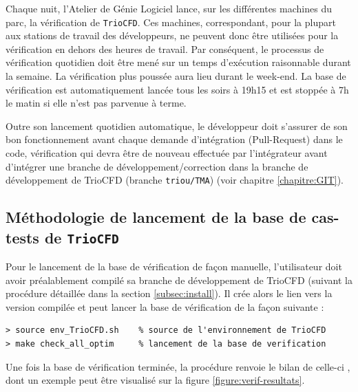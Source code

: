 Chaque nuit, l'Atelier de G\'enie Logiciel lance, sur les diff\'erentes machines du parc, la v\'erification de \texttt{TrioCFD}. Ces machines, correspondant, pour la plupart aux stations de travail des d\'eveloppeurs, ne peuvent donc \^etre utilis\'ees pour la v\'erification en dehors des heures de travail. Par cons\'equent, le processus de v\'erification quotidien doit \^etre men\'e sur un temps d'ex\'ecution raisonnable durant la semaine. La v\'erification plus pouss\'ee aura lieu durant le week-end. La base de vérification est automatiquement lanc\'ee tous les soirs \`a 19h15 et est stopp\'ee \`a 7h le matin si elle n'est pas parvenue \`a terme.\smallskip\newline

Outre son lancement quotidien automatique, le d\'eveloppeur doit s'assurer de son bon fonctionnement avant chaque demande d'int\'egration (Pull-Request) dans le code, v\'erification qui devra \^etre de nouveau effectu\'ee par l'int\'egrateur avant d'int\'egrer une branche de d\'eveloppement/correction dans la branche de d\'eveloppement de TrioCFD (branche \texttt{triou/TMA}) (voir chapitre \ref{chapitre:GIT}).

\subsection{Méthodologie de lancement de la base de cas-tests de \texttt{TrioCFD}}
Pour le lancement de la base de vérification de façon manuelle, l'utilisateur doit avoir préalablement compilé sa branche de développement de TrioCFD (suivant la procédure détaillée dans la section \ref{subsec:install}). Il crée alors le lien vers la version compilée et peut lancer la base de vérification de la façon suivante :
\footnotesize
\begin{lstlisting}
> source env_TrioCFD.sh    % source de l'environnement de TrioCFD
> make check_all_optim     % lancement de la base de verification
\end{lstlisting}
\normalsize

Une fois la base de vérification terminée, la procédure renvoie le bilan de celle-ci , dont un exemple peut être visualisé sur la figure \ref{figure:verif-resultats}.\medskip\newline

